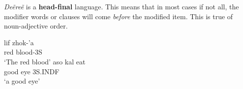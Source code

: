 \emph{Deẽreẽ} is a \textbf{head-final} language. This means that in most cases if not all, the modifier words or clauses will come \emph{before} the modified item. This is true of noun-adjective order.

\begin{exe}
\label{ex:syntax-noun}
\ex
\gll lif zhok-’a\\
red blood-3S\\
\trans ‘The red blood’
\ex
\gll aso kal eat\\
good eye 3S.INDF\\
\trans ‘a good eye’
\end{exe}

